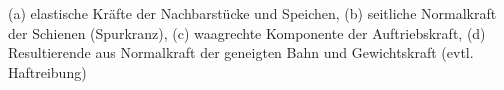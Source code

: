 (a) elastische Kräfte der Nachbarstücke und Speichen, (b) seitliche Normalkraft der Schienen (Spurkranz), (c) waagrechte Komponente der Auftriebskraft, (d) Resultierende aus Normalkraft der geneigten Bahn und Gewichtskraft (evtl. Haftreibung)
